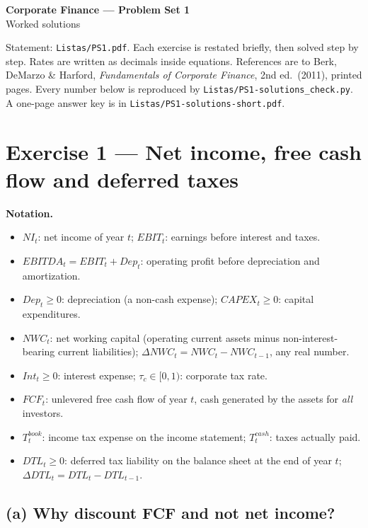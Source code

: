 \documentclass[11pt,a4paper]{article}
\numberwithin{equation}{section}
\newenvironment{notation}{\par\noindent\textbf{Notation.}\begin{itemize}[leftmargin=1.4em]}{\end{itemize}}
\begin{document}
\begin{center}
  {\Large\bfseries Corporate Finance --- Problem Set 1}\\[4pt]
  {\large Worked solutions}
\end{center}

\noindent Statement: \texttt{Listas/PS1.pdf}. Each exercise is restated briefly, then solved
step by step. Rates are written as decimals inside equations. References are to Berk, DeMarzo \&
Harford, \emph{Fundamentals of Corporate Finance}, 2nd ed.\ (2011), printed pages. Every number
below is reproduced by \texttt{Listas/PS1-solutions\_check.py}. A one-page answer key is in
\texttt{Listas/PS1-solutions-short.pdf}.

\section{Exercise 1 --- Net income, free cash flow and deferred taxes}

\begin{notation}
  \item $NI_t$: net income of year $t$; $EBIT_t$: earnings before interest and taxes.
  \item $EBITDA_t = EBIT_t + Dep_t$: operating profit before depreciation and amortization.
  \item $Dep_t\ge 0$: depreciation (a non-cash expense); $CAPEX_t\ge0$: capital expenditures.
  \item $NWC_t$: net working capital (operating current assets minus non-interest-bearing current
        liabilities); $\Delta NWC_t = NWC_t - NWC_{t-1}$, any real number.
  \item $Int_t\ge0$: interest expense; $\tau_c\in[0,1)$: corporate tax rate.
  \item $FCF_t$: unlevered free cash flow of year $t$, cash generated by the assets for
        \emph{all} investors.
  \item $T^{book}_t$: income tax expense on the income statement; $T^{cash}_t$: taxes actually paid.
  \item $DTL_t\ge0$: deferred tax liability on the balance sheet at the end of year $t$;
        $\Delta DTL_t = DTL_t - DTL_{t-1}$.
\end{notation}

\subsection*{(a) Why discount FCF and not net income?}
\end{document}
